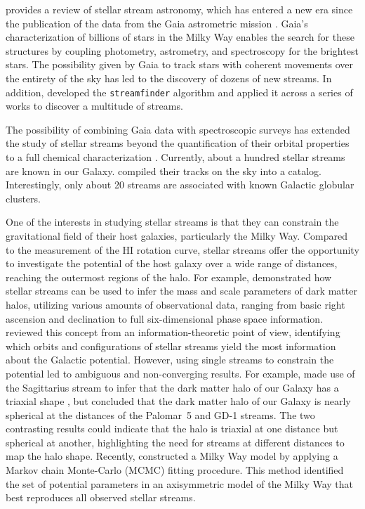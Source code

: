   
  \citet{2025NewAR.10001713B} provides a review of stellar stream astronomy, which has entered a new era since the publication of the data from the Gaia astrometric mission \citep{2016A&A...595A...1G}. Gaia's characterization of billions of stars in the Milky Way enables the search for these structures by coupling photometry, astrometry, and spectroscopy for the brightest stars. The possibility given by Gaia to track stars with coherent movements over the entirety of the sky has led to the discovery of dozens of new streams. In addition, \citet{2018MNRAS.477.4063M} developed the \texttt{streamfinder} algorithm and applied it across a series of works \citep{2018MNRAS.481.3442M,  2018ApJ...865...85I, 2019ApJ...872..152I} to discover a multitude of streams.
  
  The possibility of combining Gaia data with spectroscopic surveys has extended the study of stellar streams beyond the quantification of their orbital properties to a full chemical characterization \citep{2019MNRAS.490.3508L, 2020AJ....160..181J, 2021ApJ...911..149L, 2022ApJ...928...30L, 2024MNRAS.529.2413U}. Currently, about a hundred stellar streams are known in our Galaxy. \citet{2023MNRAS.520.5225M} compiled their tracks on the sky into a catalog. Interestingly, only about 20 streams are associated with known Galactic globular clusters.

  One of the interests in studying stellar streams is that they can constrain the gravitational field of their host galaxies, particularly the Milky Way. Compared to the measurement of the HI rotation curve, stellar streams offer the opportunity to investigate the potential of the host galaxy over a wide range of distances, reaching the outermost regions of the halo. For example, \citet{2011MNRAS.417..198V} demonstrated how stellar streams can be used to infer the mass and scale parameters of dark matter halos, utilizing various amounts of observational data, ranging from basic right ascension and declination to full six-dimensional phase space information. \citet{2018ApJ...867..101B} reviewed this concept from an information-theoretic point of view, identifying which orbits and configurations of stellar streams yield the most information about the Galactic potential. However, using single streams to constrain the potential led to ambiguous and non-converging results. For example, \citet{2010ApJ...718.1128L} made use of the Sagittarius stream to infer that the dark matter halo of our Galaxy has a triaxial shape \citep[see also][]{2004MNRAS.351..643H, 2005ApJ...619..800J, 2005ApJ...619..807L}, but \citet{2016ApJ...833...31B} concluded that the dark matter halo of our Galaxy is nearly spherical at the distances of the Palomar~5 and GD-1 streams. The two contrasting results could indicate that the halo is triaxial at one distance but spherical at another, highlighting the need for streams at different distances to map the halo shape. Recently, \citet{2024ApJ...967...89I} constructed a Milky Way model by applying a Markov chain Monte-Carlo (MCMC) fitting procedure. This method identified the set of potential parameters in an axisymmetric model of the Milky Way that best reproduces all observed stellar streams.
  

